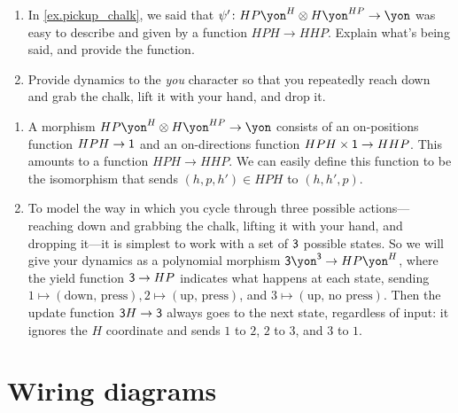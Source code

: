 \documentclass[Book-Poly]{subfiles}
\begin{document}
\begin{exercise}\label{exc.pickup_chalk}
\begin{enumerate}
	\item In \cref{ex.pickup_chalk}, we said that $\psi'\colon HP\yon^H\otimes H\yon^{HP}\to\yon$ was easy to describe and given by a function $HPH\to HHP$. Explain what's being said, and provide the function.
	\item Provide dynamics to the \textit{you} character so that you repeatedly reach down and grab the chalk, lift it with your hand, and drop it. 
\qedhere
\end{enumerate}
\begin{solution}
\begin{enumerate}
    \item A morphism $HP\yon^H \otimes H\yon^{HP} \to \yon$ consists of an on-positions function $HPH \to \textsf{1}$ and an on-directions function $HPH \times \textsf{1} \to HHP$.
    This amounts to a function $HPH \to HHP$.
    We can easily define this function to be the isomorphism that sends $(h,p,h') \in HPH$ to $(h,h',p)$.
    \item To model the way in which you cycle through three possible actions---reaching down and grabbing the chalk, lifting it with your hand, and dropping it---it is simplest to work with a set of $\textsf{3}$ possible states.
    So we will give your dynamics as a polynomial morphism $\3\yon^\3 \to HP\yon^H$, where the yield function $\textsf{3} \to HP$ indicates what happens at each state, sending $1 \mapsto (\text{down, press}), 2 \mapsto (\text{up, press})$, and $3 \mapsto (\text{up, no press})$.
    Then the update function $\textsf{3}H \to \textsf{3}$ always goes to the next state, regardless of input: it ignores the $H$ coordinate and sends $1$ to $2$, $2$ to $3$, and $3$ to $1$.
\end{enumerate}
\end{solution}
\end{exercise}

\section{Wiring diagrams}
\end{document}
